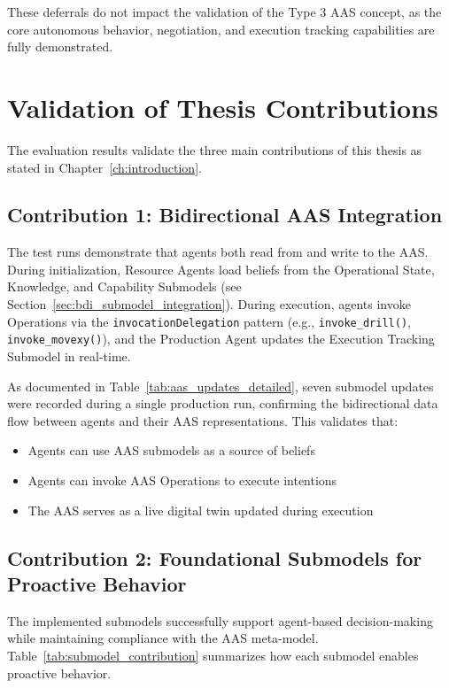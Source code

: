 These deferrals do not impact the validation of the Type 3 \ac{AAS} concept, as the core autonomous behavior, negotiation, and execution tracking capabilities are fully demonstrated.
\section{Validation of Thesis Contributions}
\label{sec:contribution_validation}

The evaluation results validate the three main contributions of this thesis as stated in Chapter~\ref{ch:introduction}.

\subsection{Contribution 1: Bidirectional AAS Integration}

The test runs demonstrate that agents both read from and write to the \ac{AAS}. During initialization, Resource Agents load beliefs from the Operational State, Knowledge, and Capability Submodels (see Section~\ref{sec:bdi_submodel_integration}). During execution, agents invoke Operations via the \texttt{invocationDelegation} pattern (e.g., \texttt{invoke\_drill()}, \texttt{invoke\_movexy()}), and the Production Agent updates the Execution Tracking Submodel in real-time. 

As documented in Table~\ref{tab:aas_updates_detailed}, seven submodel updates were recorded during a single production run, confirming the bidirectional data flow between agents and their \ac{AAS} representations. This validates that:
\begin{itemize}
    \item Agents can use \ac{AAS} submodels as a source of beliefs
    \item Agents can invoke \ac{AAS} Operations to execute intentions
    \item The \ac{AAS} serves as a live digital twin updated during execution
\end{itemize}

\subsection{Contribution 2: Foundational Submodels for Proactive Behavior}

The implemented submodels successfully support agent-based decision-making while maintaining compliance with the \ac{AAS} meta-model. Table~\ref{tab:submodel_contribution} summarizes how each submodel enables proactive behavior.

